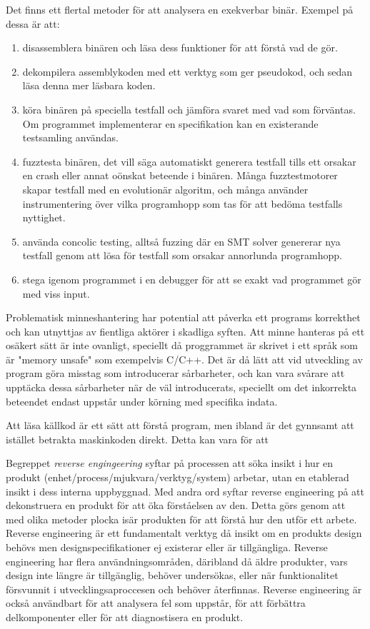 Det finns ett flertal metoder för att analysera en exekverbar binär. Exempel på dessa är att: 
\begin{enumerate}
  \item disassemblera binären och läsa dess funktioner för att förstå vad de gör.
  \item dekompilera assemblykoden med ett verktyg som ger pseudokod, och sedan läsa denna mer
    läsbara koden.
  \item köra binären på speciella testfall och jämföra svaret med vad som förväntas. Om
    programmet implementerar en specifikation kan en existerande testsamling användas.
  \item fuzztesta binären, det vill säga automatiskt generera testfall tills ett orsakar en crash eller
    annat oönskat beteende i binären. Många fuzztestmotorer skapar testfall med en evolutionär
    algoritm, och många använder instrumentering över vilka programhopp som tas för att bedöma
    testfalls nyttighet.
  \item använda concolic testing, alltså fuzzing där en SMT solver genererar nya testfall genom att
    lösa för testfall som orsakar annorlunda programhopp.
  \item stega igenom programmet i en debugger för att se exakt vad programmet gör med viss input.
\end{enumerate}

Problematisk minneshantering har potential att påverka ett programs korrekthet och 
kan utnyttjas av fientliga aktörer i skadliga syften. Att minne hanteras på ett 
osäkert sätt är inte ovanligt, speciellt då proggrammet är skrivet i ett språk som är 
"memory unsafe" som exempelvis C/C++. Det är då lätt att vid utveckling av program 
göra misstag som introducerar sårbarheter, och kan vara svårare att upptäcka dessa 
sårbarheter när de väl introducerats, speciellt om det inkorrekta beteendet endast 
uppstår under körning med specifika indata.

Att läsa källkod är ett sätt att förstå program, men ibland är det gynnsamt att istället betrakta
maskinkoden direkt. Detta kan vara för att

Begreppet \textit{reverse engingeering} syftar på processen att söka insikt i hur en produkt 
(enhet/process/mjukvara/verktyg/system) arbetar, utan en etablerad insikt i dess interna 
uppbyggnad. Med andra ord syftar reverse engineering på att dekonstruera en produkt för att 
öka förståelsen av den. Detta görs genom att med olika metoder plocka isär produkten för 
att förstå hur den utför ett arbete. Reverse engineering är ett fundamentalt verktyg då insikt 
om en produkts design behövs men designspecifikationer ej existerar eller är tillgängliga. 
Reverse engineering har flera användningsområden, däribland då äldre produkter, vars design 
inte längre är tillgänglig, behöver undersökas, eller när funktionalitet försvunnit i 
utvecklingsaproccesen och behöver återfinnas. Reverse engineering är också användbart för 
att analysera fel som uppstår, för att förbättra delkomponenter eller för att diagnostisera 
en produkt.

